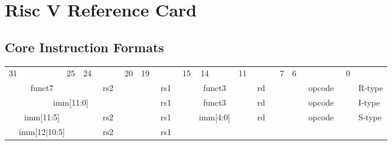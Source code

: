 \section*{Risc V Reference Card}

\subsection*{Core Instruction Formats}

    \begin{tabular} %
    	{p{0.01mm}p{0.01mm}p{0.01mm}p{0.01mm}p{0.01mm}p{0.01mm}p{0.01mm}p{0.01mm}
        p{0.01mm}p{0.01mm}p{0.01mm}p{0.01mm}p{0.01mm}p{0.01mm}p{0.01mm}p{0.01mm}
        p{0.01mm}p{0.01mm}p{0.01mm}p{0.01mm}p{0.01mm}p{0.01mm}p{0.01mm}p{0.01mm}
        p{0.01mm}p{0.01mm}p{0.01mm}p{0.01mm}p{0.01mm}p{0.01mm}p{0.01mm}p{0.01mm}l}
        \multicolumn{1}{c}{31}&&&&&&
        \multicolumn{1}{c}{25}&
        \multicolumn{1}{c}{24}&&&&
        \multicolumn{1}{c}{20}&
        \multicolumn{1}{c}{19}&&&&
        \multicolumn{1}{c}{15}&
        \multicolumn{1}{c}{14}&&&
        \multicolumn{1}{c}{11}&&&&
        \multicolumn{1}{c}{7}&
        \multicolumn{1}{c}{6}&&&&&&
        \multicolumn{1}{c}{0}&
        \\
        \cline{0-31} 
        \multicolumn{7}{|c|}{funct7} &
        \multicolumn{5}{c|}{rs2}&
        \multicolumn{5}{c|}{rs1}&
        \multicolumn{3}{c|}{funct3}&
        \multicolumn{5}{c|}{rd}&
        \multicolumn{7}{c|}{opcode}&
        R-type
        \\
        \cline{0-31} 
        \multicolumn{12}{|c|}{imm[11:0]} &
        \multicolumn{5}{c|}{rs1}&
        \multicolumn{3}{c|}{funct3}&
        \multicolumn{5}{c|}{rd}&
        \multicolumn{7}{c|}{opcode}&
        I-type
        \\
        \cline{0-31} 
        \multicolumn{7}{|c|}{imm[11:5]} &
        \multicolumn{5}{c|}{rs2}&
        \multicolumn{5}{c|}{rs1}&
        \multicolumn{3}{c|}{imm[4:0]}&
        \multicolumn{5}{c|}{rd}&
        \multicolumn{7}{c|}{opcode}&
        S-type
        \\
        \cline{0-31} 
        \multicolumn{7}{|c|}{imm[12$|$10:5]} &
        \multicolumn{5}{c|}{rs2}&
        \multicolumn{5}{c|}{rs1}&

\end{tabular}
